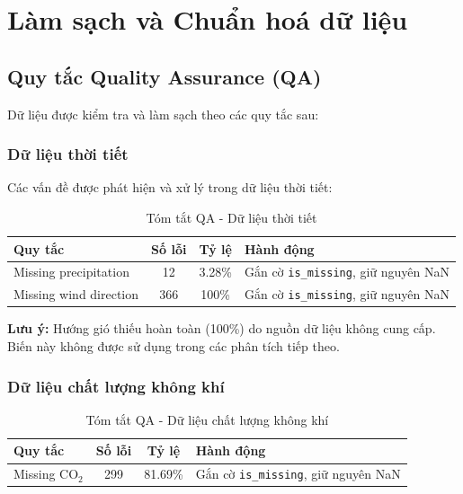 \documentclass[12pt,a4paper]{article}
\newcommand{\cotwo}{CO$_2$}
\begin{document}
\section{Làm sạch và Chuẩn hoá dữ liệu}

\subsection{Quy tắc Quality Assurance (QA)}

Dữ liệu được kiểm tra và làm sạch theo các quy tắc sau:

\subsubsection{Dữ liệu thời tiết}
Các vấn đề được phát hiện và xử lý trong dữ liệu thời tiết:

\begin{table}[H]
\centering
\caption{Tóm tắt QA - Dữ liệu thời tiết}
\label{tab:qa-weather}
\begin{tabular}{p{4cm}ccp{6cm}}
\toprule
\textbf{Quy tắc} & \textbf{Số lỗi} & \textbf{Tỷ lệ} & \textbf{Hành động} \\
\midrule
Missing precipitation & 12 & 3.28\% & Gắn cờ \texttt{is\_missing}, giữ nguyên NaN \\
Missing wind direction & 366 & 100\% & Gắn cờ \texttt{is\_missing}, giữ nguyên NaN \\
\bottomrule
\end{tabular}
\end{table}

\textbf{Lưu ý:} Hướng gió thiếu hoàn toàn (100\%) do nguồn dữ liệu không cung cấp. Biến này không được sử dụng trong các phân tích tiếp theo.

\subsubsection{Dữ liệu chất lượng không khí}

\begin{table}[H]
\centering
\caption{Tóm tắt QA - Dữ liệu chất lượng không khí}
\label{tab:qa-airquality}
\begin{tabular}{p{4cm}ccp{6cm}}
\toprule
\textbf{Quy tắc} & \textbf{Số lỗi} & \textbf{Tỷ lệ} & \textbf{Hành động} \\
\midrule
Missing \cotwo{} & 299 & 81.69\% & Gắn cờ \texttt{is\_missing}, giữ nguyên NaN \\
\bottomrule
\end{tabular}
\end{table}
\end{document}
